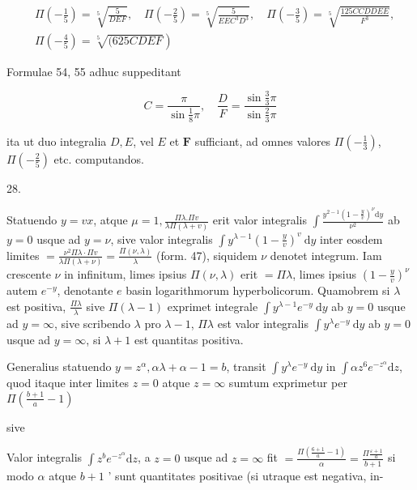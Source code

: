 \documentclass[10pt]{article}
\begin{document}
\[
\begin{aligned}
& \Pi\left(-\frac{1}{5}\right)=\sqrt[5]{\frac{5}{D E F}}, \quad \Pi\left(-\frac{2}{5}\right)=\sqrt[5]{\frac{5}{E E C^{3} D^{3}}}, \quad \Pi\left(-\frac{3}{5}\right)=\sqrt[5]{\frac{125 C C D D E E}{F^{3}}}, \\
& \left.\Pi\left(-\frac{4}{5}\right)=\sqrt[5]{(625 C D E F}\right)
\end{aligned}
\]

Formulae 54, 55 adhuc suppeditant

\[
C=\frac{\pi}{\sin \frac{1}{8} \pi}, \quad \frac{D}{F}=\frac{\sin \frac{3}{3} \pi}{\sin \frac{2}{3} \pi}
\]

ita ut duo integralia \(D, E\), vel \(E\) et \(\boldsymbol{F}\) sufficiant, ad omnes valores \(\Pi\left(-\frac{1}{3}\right)\), \(\Pi\left(-\frac{2}{5}\right)\) etc. computandos.

28.

Statuendo \(y=v x\), atque \(\mu=1, \frac{\Pi \lambda . \Pi v}{\lambda \Pi(\lambda+v)}\) erit valor integralis \(\int \frac{y^{2-1}\left(1-\frac{y}{v}\right)^{\nu} \mathrm{d} y}{\nu^{2}}\) ab \(y=0\) usque ad \(y=\nu\), sive valor integralis \(\int y^{\lambda-1}\left(1-\frac{y}{v}\right)^{v} \mathrm{~d} y\) inter eosdem limites \(=\frac{\nu^{2} \Pi \lambda \cdot \Pi v}{\lambda \Pi(\lambda+\nu)}=\frac{\Pi(\nu, \lambda)}{\lambda}\) (form. 47), siquidem \(\nu\) denotet integrum. Iam crescente \(\nu\) in infinitum, limes ipsius \(\Pi(\nu, \lambda)\) erit \(=\Pi \lambda\), limes ipsius \(\left(1-\frac{y}{v}\right)^{\nu}\) autem \(e^{-y}\), denotante \(e\) basin logarithmorum hyperbolicorum. Quamobrem si \(\lambda\) est positiva, \(\frac{\Pi \lambda}{\lambda}\) sive \(\Pi(\lambda-1)\) exprimet integrale \(\int y^{\lambda-1} e^{-y} \mathrm{~d} y\) ab \(y=0\) usque ad \(y=\infty\), sive scribendo \(\lambda\) pro \(\lambda-1\), \(\Pi \lambda\) est valor integralis \(\int y^{\lambda} e^{-y} \mathrm{~d} y\) ab \(y=0\) usque ad \(y=\infty\), si \(\lambda+1\) est quantitas positiva.

Generalius statuendo \(y=z^{\alpha}, \alpha \lambda+\alpha-1=b\), transit \(\int y^{\lambda} e^{-y} \mathrm{~d} y\) in \(\int \alpha z^{6} e^{-z^{\alpha}} \mathrm{d} z\), quod itaque inter limites \(z=0\) atque \(z=\infty\) sumtum exprimetur per \(\Pi\left(\frac{b+1}{a}-1\right)\)

sive

Valor integralis \(\int z^{b} e^{-z^{\alpha}} \mathrm{d} z\), a \(z=0\) usque ad \(z=\infty\) fit \(=\frac{\Pi\left(\frac{6+1}{a}-1\right)}{\alpha}=\frac{\Pi \frac{\varepsilon+1}{a}}{b+1}\) si modo \(\alpha\) atque \(b+1\) ' sunt quantitates positivae (si utraque est negativa, in-
\end{document}
